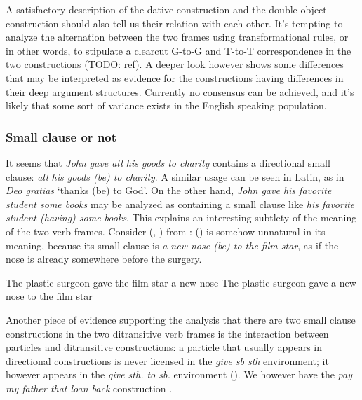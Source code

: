 \documentclass[UTF8, a4paper, oneside, scheme=plain, 12pt]{ctexbook}
\newcommand*{\citepage}[1]{p.~{#1}}
\newcommand{\form}[1]{\emph{#1}}
\newcommand{\translate}[1]{`#1'}
\begin{document}
A satisfactory description of the dative construction and the double object construction 
should also tell us their relation with each other. 
It's tempting to analyze the alternation between the two frames using transformational rules, 
or in other words, to stipulate a clearcut G-to-G and T-to-T correspondence in the two constructions (TODO: ref).
A deeper look however shows some differences that may be interpreted as evidence for 
the constructions having differences in their deep argument structures.
Currently no consensus can be achieved, 
and it's likely that some sort of variance exists in the English speaking population.

\subsubsection{Small clause or not}

It seems that \form{John gave all his goods to charity} contains a directional small clause:
\form{all his goods (be) to charity}.
A similar usage can be seen in Latin, as in \form{Deo gratias} \translate{thanks (be) to God}.
On the other hand, \form{John gave his favorite student some books}
may be analyzed as containing a small clause like \form{his favorite student (having) some books}.
This explains an interesting subtlety of the meaning of the two verb frames.
Consider (, )
from \citet[\citepage{81}]{devine2006latin}:
() is somehow unnatural in its meaning, 
because its small clause is \form{a new nose (be) to the film star}, 
as if the nose is already somewhere before the surgery.

\begin{exe}
    \ex\label{ex:valence.give.1} The plastic surgeon gave the film star a new nose 
    \ex\label{ex:valence.give.2} The plastic surgeon gave a new nose to the film star
\end{exe}

Another piece of evidence supporting the analysis that 
there are two small clause constructions in the two ditransitive verb frames
is the interaction between particles and ditransitive constructions: 
a particle that usually appears in directional constructions 
is never licensed in the \form{give sb sth} environment; 
it however appears in the \form{give sth. to sb.} environment
().
We however have the \form{pay my father that loan back} construction
\citep[\citepage{287}]{cgel}.
\end{document}
